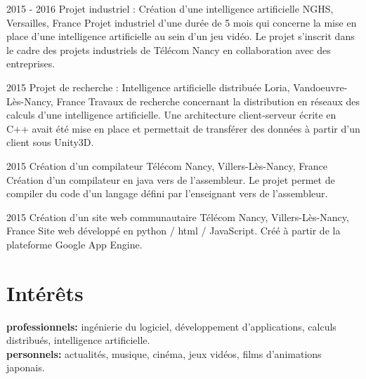 \documentclass[]{cv_french} %
\begin{document}
\begin{entrylist}

\entry
{2015 - 2016}
{Projet industriel : Création d'une intelligence artificielle}
{NGHS, Versailles, France}
{ Projet industriel d'une durée de 5 mois qui concerne la mise en place d'une intelligence artificielle au sein d'un jeu vidéo. Le projet s'inscrit dans le cadre des projets industriels de Télécom Nancy en collaboration avec des entreprises. }

\entry
{2015}
{Projet de recherche : Intelligence artificielle distribuée}
{Loria, Vandoeuvre-Lès-Nancy, France}
{ Travaux de recherche concernant la distribution en réseaux des calculs d'une intelligence artificielle. Une architecture client-serveur écrite en C++ avait été mise en place et permettait de transférer des données à partir d'un client sous Unity3D.}

\entry
{2015}
{Création d'un compilateur}
{Télécom Nancy, Villers-Lès-Nancy, France}
{ Création d'un compilateur en java vers de l'assembleur. Le projet  permet de compiler du code d'un langage défini par l'enseignant vers de l'assembleur. }

\entry
{2015}
{Création d'un site web communautaire}
{Télécom Nancy, Villers-Lès-Nancy, France}
{ Site web développé en python / html / JavaScript. Créé à partir de la plateforme Google App Engine. }


\end{entrylist}



\section{Intérêts}

\textbf{professionnels:} ingénierie du logiciel, développement d'applications, calculs distribués, intelligence artificielle. \\
\textbf{personnels:} actualités, musique, cinéma, jeux vidéos, films d'animations japonais.


\end{document}
